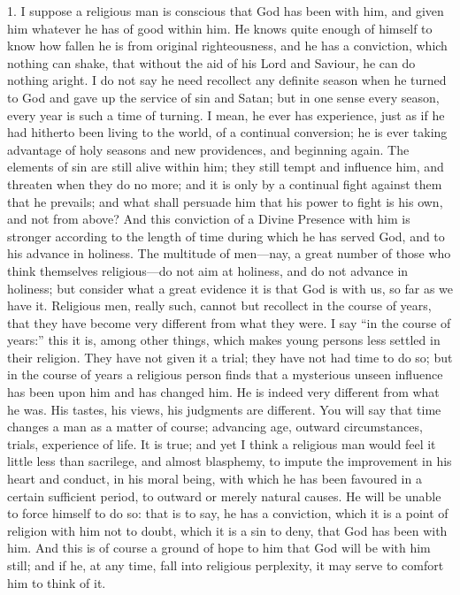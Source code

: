 1. I suppose a religious man is conscious that God has been with
him, and given him whatever he has of good within him. He knows quite
enough of himself to know how fallen he is from original
righteousness, and he has a conviction, which nothing can shake, that
without the aid of his Lord and Saviour, he can do nothing aright. I
do not say he need recollect any definite season when he turned to God
and gave up the service of sin and Satan; but in one sense every
season, every year is such a time of turning. I mean, he ever has
experience, just as if he had hitherto been living to the world, of a
continual conversion; he is ever taking advantage of holy seasons and
new providences, and beginning again. The elements of sin are still
alive within him; they still tempt and influence him, and threaten
when they do no more; and it is only by a continual fight against them
that he prevails; and what shall persuade him that his power to fight
is his own, and not from above? And this conviction of a Divine
Presence with him is stronger according to the length of time during
which he has served God, and to his advance in holiness. The multitude
of men—nay, a great number of those who think themselves religious—do
not aim at holiness, and do not advance in holiness; but consider what
a great evidence it is that God is with us, so far as we have it.
Religious men, really such, cannot but recollect in the course of
years, that they have become very different from what they were. I say
``in the course of years:'' this it is, among other things,
which makes young persons less settled in their religion. They have
not given it a trial; they have not had time to do so; but in the
course of years a religious person finds that a mysterious unseen
influence has been upon him and has changed him. He is indeed very
different from what he was. His tastes, his views, his judgments are
different. You will say that time changes a man as a matter of course;
advancing age, outward circumstances, trials, experience of life. It
is true; and yet I think a religious man would feel it little less
than sacrilege, and almost blasphemy, to impute the improvement in his
heart and conduct, in his moral being, with which he has been favoured
in a certain sufficient period, to outward or merely natural causes.
He will be unable to force himself to do so: that is to say, he has a
conviction, which it is a point of religion with him not to doubt,
which it is a sin to deny, that God has been with him. And this is of
course a ground of hope to him that God will be with him still; and if
he, at any time, fall into religious perplexity, it may serve to
comfort him to think of it.

